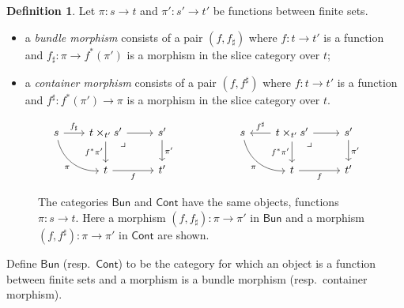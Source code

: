 \documentclass[11pt, article, one side]{memoir}
\theoremstyle{theorem}
\theoremstyle{definition}
\newtheorem{definition}[equation]{Definition}
\theoremstyle{remark}
\newcommand{\Cat}[1]{\mathsf{#1}}%
\newcommand{\cont}{\Cat{Cont}}
\newcommand{\bun}{\Cat{Bun}}
\begin{document}
\begin{definition}\label{def.sheaves_bundles}
Let $\pi\colon s\to t$ and $\pi'\colon s'\to t'$ be functions between finite sets.
\begin{itemize}
	\item a \emph{bundle morphism} consists of a pair $(f,f_\sharp)$ where $f\colon t\to t'$ is a function and $f_\sharp\colon \pi\to f^*(\pi')$ is a morphism in the slice category over $t$;
	\item a \emph{container morphism} consists of a pair $(f,f^\sharp)$ where $f\colon t\to t'$ is a function and $f^\sharp\colon f^*(\pi')\to \pi$ is a morphism in the slice category over $t$.
\end{itemize}

\begin{figure}
\[
\begin{tikzcd}
s\ar[dr, bend right=40pt, "\pi"']&[-5pt]
t\times_{t'}s'\ar[r]\ar[d, "f^*\pi'"']\ar[from=l, "f_\sharp"]&
s'\ar[d, "\pi'"]\\&
t\ar[r, "f"']&
t'\ar[ul, phantom, very near end, "\lrcorner"]
\end{tikzcd}
\hspace{.75in}
\begin{tikzcd}
s\ar[dr, bend right=40pt, "\pi"']&[-5pt]
t\times_{t'}s'\ar[r]\ar[d, "f^*\pi'"']\ar[l, "f^\sharp"']&
s'\ar[d, "\pi'"]\\&
t\ar[r, "f"']&
t'\ar[ul, phantom, very near end, "\lrcorner"]
\end{tikzcd}
\]
\caption{The categories $\bun$ and $\cont$ have the same objects, functions $\pi\colon s\to t$. Here a morphism $(f,f_\sharp)\colon \pi\to \pi'$ in $\bun$ and a morphism $(f,f^\sharp)\colon \pi\to\pi'$ in $\cont$ are shown.
}
\label{fig.bund_cont_maps}
\end{figure}
Define $\bun$ (resp.\ $\cont$) to be the category for which an object is a function between finite sets and a morphism is a bundle morphism (resp.\ container morphism).
\end{definition}
\end{document}
